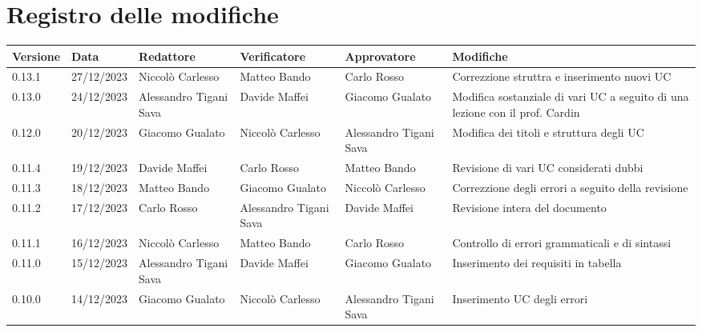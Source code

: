 \section*{Registro delle modifiche}


\begin{table}[H]
	\centering
	\fontsize{10}{12}\selectfont
	\begin{tabularx}{\textwidth}{X|X|X|X|X|X}
		\textbf{Versione}     & \textbf{Data}        & \textbf{Redattore}     &
		\textbf{Verificatore} & \textbf{Approvatore} & \textbf{Modifiche}                                                                                                                    \\
		\toprule
		0.13.1	              & 27/12/2023           & Niccolò Carlesso       & Matteo Bando           & Carlo Rosso            & Correzzione struttra e inserimento nuovi UC                                     \\
		\hline
		0.13.0	              & 24/12/2023           & Alessandro Tigani Sava & Davide Maffei          & Giacomo Gualato        & Modifica sostanziale di vari UC a seguito di una lezione con il prof. Cardin                                     \\
		\hline
		0.12.0	              & 20/12/2023           & Giacomo Gualato        & Niccolò Carlesso       & Alessandro Tigani Sava & Modifica dei titoli e struttura degli UC                                     \\
		\hline
		0.11.4	              & 19/12/2023           & Davide Maffei          & Carlo Rosso            & Matteo Bando           & Revisione di vari UC considerati dubbi                                     \\
		\hline
		0.11.3                & 18/12/2023           & Matteo Bando           & Giacomo Gualato        & Niccolò Carlesso       & Correzzione degli errori a seguito della revisione                                     \\
		\hline
		0.11.2                & 17/12/2023           & Carlo Rosso            & Alessandro Tigani Sava & Davide Maffei          & Revisione intera del documento                                     \\
		\hline
		0.11.1                & 16/12/2023           & Niccolò Carlesso       & Matteo Bando           & Carlo Rosso            & Controllo di errori grammaticali e di sintassi                                     \\
		\hline
		0.11.0                & 15/12/2023           & Alessandro Tigani Sava & Davide Maffei          & Giacomo Gualato        & Inserimento dei requisiti in tabella                                     \\
		\hline
		0.10.0                & 14/12/2023           & Giacomo Gualato        & Niccolò Carlesso       & Alessandro Tigani Sava & Inserimento UC degli errori                                     \\
		\bottomrule
	\end{tabularx}
\end{table}


